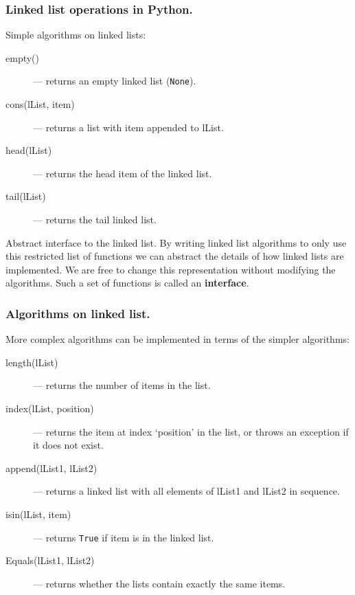 \documentclass{beamer} %
\newcommand\emc[1]{\textcolor{brightblue}{\textbf{#1}}}
\begin{document}
\begin{frame}
\frametitle{Linked list operations in Python.}

Simple algorithms on linked lists:
\begin{description}
  \item[empty()] --- returns an empty linked list (\texttt{None}).
  \item[cons(lList, item)] --- returns a list with item appended to lList.
  \item[head(lList)] --- returns the head item of the linked list.
  \item[tail(lList)] --- returns the tail linked list.
\end{description}

\vspace{3mm}
\begin{block}{Abstract interface to the linked list.}
By writing linked list algorithms to only use this restricted list of functions we can abstract the details of how linked lists are implemented. We are free to change this representation without modifying the algorithms. Such a set of functions is called an \emc{interface}.
\end{block}

\end{frame}



\begin{frame}
\frametitle{Algorithms on linked list.}

More complex algorithms can be implemented in terms of the simpler algorithms:
\begin{description}
  \item[length(lList)] --- returns the number of items in the list.
  \item[index(lList, position)] --- returns the item at index `position' in the list, or throws an exception if it does not exist.
  \item[append(lList1, lList2)] --- returns a linked list with all elements of lList1 and lList2 in sequence.
  \item[isin(lList, item)] --- returns \texttt{True} if item is in the linked list.
  \item[Equals(lList1, lList2)] --- returns whether the lists contain exactly the same items.
\end{description}

\end{frame}
\end{document}

